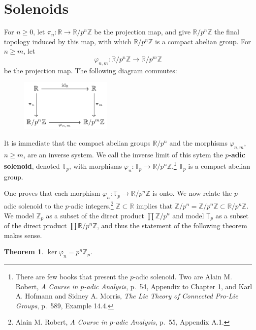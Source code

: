 \documentclass{article}
\newtheorem{theorem}{Theorem}
\theoremstyle{definition}
\begin{document}
 
 \section{Solenoids}
 For $n \geq 0$, let $\pi_n:\mathbb{R} \to \mathbb{R}/p^n \mathbb{Z}$ be the projection map, and give $\mathbb{R}/p^n \mathbb{Z}$ the final
 topology induced by this map, with which
$\mathbb{R}/p^n \mathbb{Z}$ is  a compact abelian group. 
 For $n \geq m$, let
 \[
 \varphi_{n,m}:\mathbb{R}/p^n \mathbb{Z} \to \mathbb{R}/p^m \mathbb{Z}
 \]
 be the projection map. The following diagram commutes:
 
\begin{figure}[h]
\begin{center}
\includegraphics[width=0.4\textwidth]{tikz}
\end{center}
\end{figure}

It is immediate that the compact abelian groups $\mathbb{R}/p^n$ and the morphisms $\varphi_{n,m}$, $n \geq m$,
are an inverse system. We call the inverse limit of this sytem the \textbf{$p$-adic solenoid}, denoted
$\mathbb{T}_p$, with morphisms $\varphi_n:\mathbb{T}_p \to \mathbb{R}/p^n \mathbb{Z}$.\footnote{There are few books that present the $p$-adic solenoid. Two are Alain M. Robert, {\em A Course in $p$-adic Analysis}, p.~54, Appendix to Chapter 1, and
Karl A. Hofmann and Sidney A. Morris, {\em The Lie Theory of Connected Pro-Lie Groups}, p.~589, Example 14.4.}
$\mathbb{T}_p$ is a compact abelian group. 

One proves that each morphism $\varphi_n:\mathbb{T}_p \to \mathbb{R}/p^n \mathbb{Z}$ is onto. 
We now relate the $p$-adic solenoid to the $p$-adic integers.\footnote{Alain M. Robert, {\em A Course in $p$-adic Analysis}, p.~55, Appendix A.1.}
 $\mathbb{Z} \subset
 \mathbb{R}$ implies that $\mathbb{Z}/p^n = \mathbb{Z}/p^n \mathbb{Z} \subset
 \mathbb{R}/p^n\mathbb{Z}$. We model $\mathbb{Z}_p$ as a subset of the direct product
 $\prod \mathbb{Z}/p^n$ and model $\mathbb{T}_p$ as a subset of the direct product
 $\prod \mathbb{R}/p^n\mathbb{Z}$, and thus the statement of the following theorem makes sense.

\begin{theorem}
$\ker \varphi_n = p^n \mathbb{Z}_p$.
\end{theorem}
\end{document}
